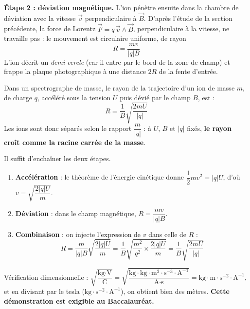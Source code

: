 \documentclass[11pt]{article}
\begin{document}
\textbf{Étape 2 : déviation magnétique.} L'ion pénètre ensuite dans la chambre de déviation avec la vitesse $\vec{v}$ perpendiculaire à $\vec{B}$. D'après l'étude de la section précédente, la force de Lorentz $\vec{F} = q\,\vec{v}\wedge\vec{B}$, perpendiculaire à la vitesse, ne travaille pas : le mouvement est circulaire uniforme, de rayon
\[ R = \frac{mv}{|q|B} \]
L'ion décrit un \emph{demi-cercle} (car il entre par le bord de la zone de champ) et frappe la plaque photographique à une distance $2R$ de la fente d'entrée.

\begin{propriete}
Dans un spectrographe de masse, le rayon de la trajectoire d'un ion de masse $m$, de charge $q$, accéléré sous la tension $U$ puis dévié par le champ $B$, est :
\[ R = \frac{1}{B}\sqrt{\frac{2mU}{|q|}} \]
Les ions sont donc séparés selon le rapport $\dfrac{m}{|q|}$ : à $U$, $B$ et $|q|$ fixés, \textbf{le rayon croît comme la racine carrée de la masse}.
\end{propriete}

\begin{experience}[Démonstration guidée de la formule $R = \dfrac{1}{B}\sqrt{\dfrac{2mU}{|q|}}$]
Il suffit d'enchaîner les deux étapes.
\begin{enumerate}
\item \textbf{Accélération} : le théorème de l'énergie cinétique donne $\dfrac{1}{2}mv^2 = |q|U$, d'où $v = \sqrt{\dfrac{2|q|U}{m}}$.
\item \textbf{Déviation} : dans le champ magnétique, $R = \dfrac{mv}{|q|B}$.
\item \textbf{Combinaison} : on injecte l'expression de $v$ dans celle de $R$ :
\[ R = \frac{m}{|q|B}\sqrt{\frac{2|q|U}{m}} = \frac{1}{B}\sqrt{\frac{m^2}{q^2}\times\frac{2|q|U}{m}} = \frac{1}{B}\sqrt{\frac{2mU}{|q|}} \]
\end{enumerate}
Vérification dimensionnelle : $\sqrt{\dfrac{\text{kg}\cdot\text{V}}{\text{C}}} = \sqrt{\dfrac{\text{kg}\cdot\text{kg}\cdot\text{m}^2\cdot\text{s}^{-3}\cdot\text{A}^{-1}}{\text{A}\cdot\text{s}}} = \text{kg}\cdot\text{m}\cdot\text{s}^{-2}\cdot\text{A}^{-1}$, et en divisant par le tesla ($\text{kg}\cdot\text{s}^{-2}\cdot\text{A}^{-1}$), on obtient bien des mètres. \textbf{Cette démonstration est exigible au Baccalauréat.}
\end{experience}
\end{document}
